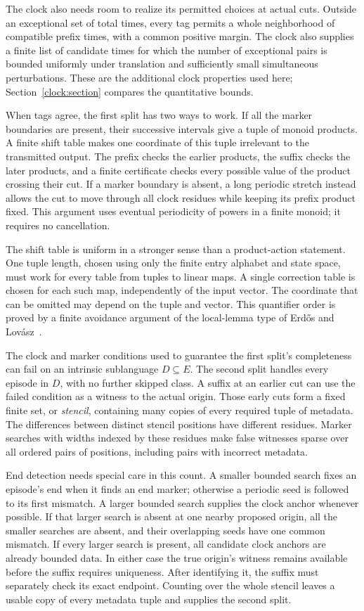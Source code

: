 The clock also needs room to realize its permitted choices at actual
cuts. Outside an exceptional set of total times, every tag permits a
whole neighborhood of compatible prefix times, with a common positive
margin. The clock also supplies a finite list of candidate times for which
the number of exceptional pairs is bounded uniformly under translation
and sufficiently small simultaneous perturbations. These are the
additional clock properties used here;
Section~\ref{clock:section} compares the quantitative bounds.

When tags agree, the first split has two ways to work. If all the marker
boundaries are present, their successive intervals give a tuple of
monoid products. A finite shift table makes one coordinate of this tuple
irrelevant to the transmitted output. The prefix checks the earlier
products, the suffix checks the later products, and a finite certificate
checks every possible value of the product crossing their cut. If a
marker boundary is absent, a long periodic stretch instead allows the
cut to move through all clock residues while keeping its prefix product
fixed. This argument uses eventual periodicity of powers in a finite
monoid; it requires no cancellation.

The shift table is uniform in a stronger sense than a product-action
statement. One tuple length, chosen using only the finite entry alphabet and state
space, must work for every table from tuples to linear maps. A single correction table is chosen for each such
map, independently of the input vector. The coordinate that can be
omitted may depend on the tuple and vector. This quantifier order is
proved by a finite avoidance argument of the local-lemma type of
Erd\H{o}s and Lov\'asz~\cite{ErdosLovasz1975}.

The clock and marker conditions used to guarantee the first split's
completeness can fail on an intrinsic sublanguage $D\subseteq E$.
The second split handles every episode in $D$, with no further skipped
class. A suffix at an earlier cut can use the failed condition as a witness
to the actual origin. Those early cuts form
a fixed finite set, or \emph{stencil}, containing many copies of every
required tuple of metadata. The differences between distinct stencil
positions have different residues. Marker searches with widths indexed
by these residues make false witnesses sparse over all ordered pairs of
positions, including pairs with incorrect metadata.

End detection needs special care in this count. A smaller bounded search
fixes an episode's end when it finds an end marker; otherwise a periodic
seed is followed to its first mismatch. A larger bounded search supplies
the clock anchor whenever possible. If that larger search is absent at
one nearby proposed origin, all the smaller searches are absent, and
their overlapping seeds have one common mismatch. If every larger search
is present, all candidate clock anchors are already bounded data. In
either case the true origin's witness remains available before the suffix
requires uniqueness. After identifying it, the suffix must separately
check its exact endpoint. Counting over the whole stencil leaves a usable
copy of every metadata tuple and supplies the second split.

